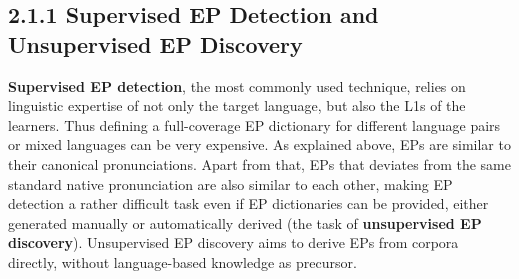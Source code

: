 \documentclass[nobib]{tufte-handout}
\begin{document}
\subsection{2.1.1 \textbf{Supervised EP Detection and Unsupervised EP Discovery}}
\textbf{Supervised EP detection}, the most commonly used technique, relies on linguistic expertise of not only the target language, but also the L1s of the learners. Thus defining a full-coverage EP dictionary for different language pairs or mixed languages can be very expensive. As explained above, EPs are similar to their canonical pronunciations. Apart from that, EPs that deviates from the same standard native pronunciation are also similar to each other, making EP detection a rather difficult task even if EP dictionaries can be provided, either generated manually or automatically derived (the task of \textbf{unsupervised EP discovery}). Unsupervised EP discovery aims to derive EPs from corpora directly, without language-based knowledge as precursor. \\
\end{document}
